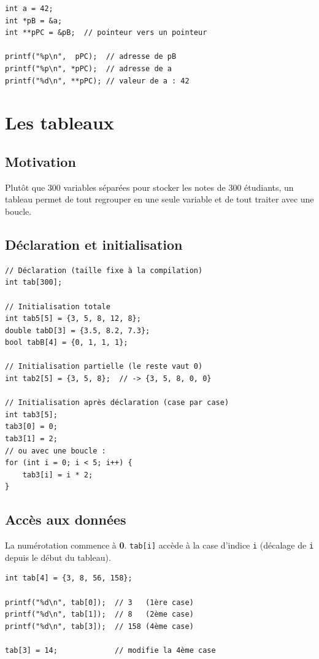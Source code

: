 \documentclass[12pt,a4paper]{article}
\begin{document}
\begin{lstlisting}[caption={Double pointeur}]
int a = 42;
int *pB = &a;
int **pPC = &pB;  // pointeur vers un pointeur

printf("%p\n",  pPC);  // adresse de pB
printf("%p\n", *pPC);  // adresse de a
printf("%d\n", **pPC); // valeur de a : 42
\end{lstlisting}

\section{Les tableaux}

\subsection{Motivation}

Plutôt que 300 variables séparées pour stocker les notes de 300 étudiants, un tableau permet de tout regrouper en une seule variable et de tout traiter avec une boucle.

\subsection{Déclaration et initialisation}

\begin{lstlisting}[caption={Déclaration et initialisation de tableaux}]
// Déclaration (taille fixe à la compilation)
int tab[300];

// Initialisation totale
int tab5[5] = {3, 5, 8, 12, 8};
double tabD[3] = {3.5, 8.2, 7.3};
bool tabB[4] = {0, 1, 1, 1};

// Initialisation partielle (le reste vaut 0)
int tab2[5] = {3, 5, 8};  // -> {3, 5, 8, 0, 0}

// Initialisation après déclaration (case par case)
int tab3[5];
tab3[0] = 0;
tab3[1] = 2;
// ou avec une boucle :
for (int i = 0; i < 5; i++) {
    tab3[i] = i * 2;
}
\end{lstlisting}

\subsection{Accès aux données}

La numérotation commence à \textbf{0}. \texttt{tab[i]} accède à la case d'indice \texttt{i} (décalage de \texttt{i} depuis le début du tableau).

\begin{lstlisting}[caption={Accès et modification}]
int tab[4] = {3, 8, 56, 158};

printf("%d\n", tab[0]);  // 3   (1ère case)
printf("%d\n", tab[1]);  // 8   (2ème case)
printf("%d\n", tab[3]);  // 158 (4ème case)

tab[3] = 14;             // modifie la 4ème case
\end{lstlisting}
\end{document}
